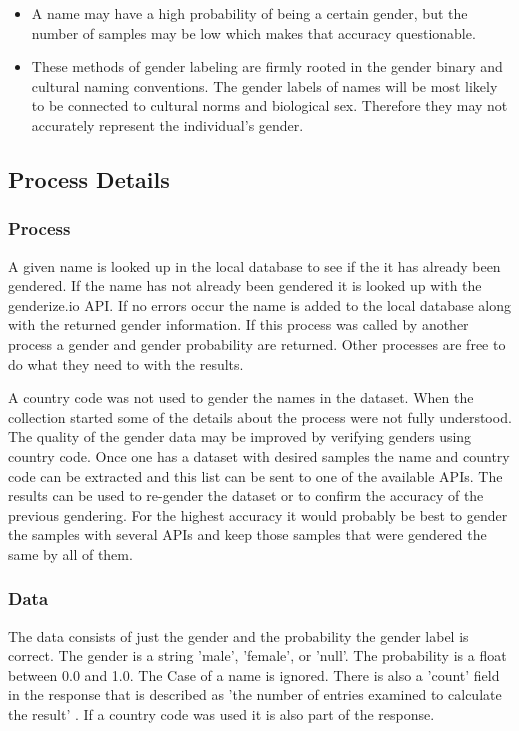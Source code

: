 \documentclass{article}
\begin{document}
\begin{itemize}
    \item A name may have a high probability of being a certain gender, but the number of samples may be low which makes that accuracy questionable.
    
    \item These methods of gender labeling are firmly rooted in the gender binary and cultural naming conventions. The gender labels of names will be most likely to be connected to cultural norms and biological sex. Therefore they may not accurately represent the individual's gender.
\end{itemize}


\subsection{Process Details}
\subsubsection*{Process}
A given name is looked up in the local database to see if the it has already been gendered. If the name has not already been gendered it is looked up with the genderize.io API. If no errors occur the name is added to the local database along with the returned gender information. If this process was called by another process a gender and gender probability are returned. Other processes are free to do what they need to with the results.

A country code was not used to gender the names in the dataset. When the collection started some of the details about the process were not fully understood. The quality of the gender data may be improved by verifying genders using country code. Once one has a dataset with desired samples the name and country code can be extracted and this list can be sent to one of the available APIs. The results can be used to re-gender the dataset or to confirm the accuracy of the previous gendering. For the highest accuracy it would probably be best to gender the samples with several APIs and keep those samples that were gendered the same by all of them.

\subsubsection*{Data}
The data consists of just the gender and the probability the gender label is correct. The gender is a string 'male', 'female', or 'null'. The probability is a float between 0.0 and 1.0. The Case of a name is ignored. There is also a 'count' field in the response that is described as 'the number of entries examined to calculate the result' \cite{WEBSITE:GENDER1}. If a country code was used it is also part of the response.
\end{document}
